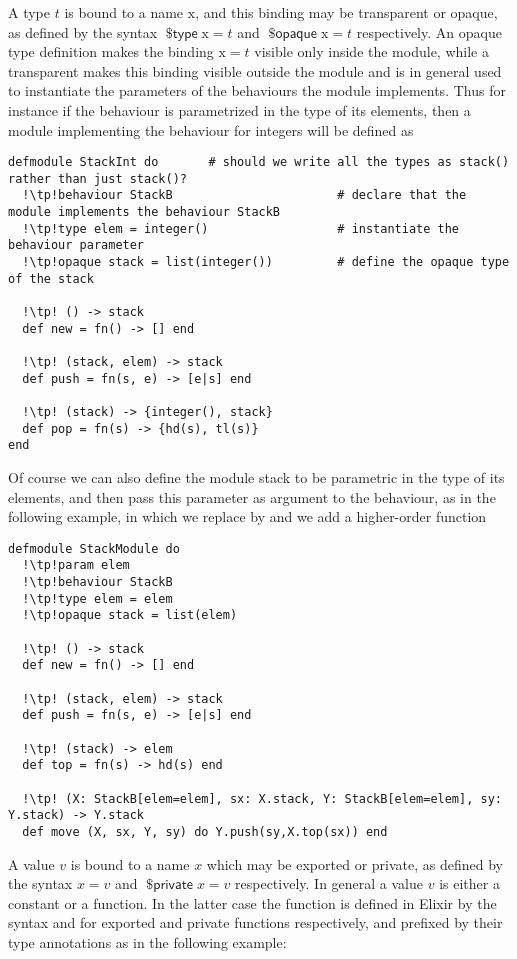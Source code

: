 \documentclass[a4paper,10pt]{article}
\DeclareMathOperator{\kwopq}{\textsf{\$opaque}}
\DeclareMathOperator{\kwtp}{\textsf{\$type}}
\DeclareMathOperator{\kwpr}{\textsf{\$private}}
\newcommand{\tx}{\textrm{x}}
\begin{document}
A type $t$ is bound to a name $\tx$, and this binding may be transparent or opaque, as defined by the syntax $\kwtp \tx = t$ and $\kwopq \tx =t$ respectively. An opaque type definition makes the binding $\tx= t$ visible only inside the module, while a transparent makes this binding visible outside the module and is in general used to instantiate the parameters of the behaviours the module implements. Thus for instance if the  behaviour is parametrized in the type  of its elements, then a module  implementing the behaviour for integers will be defined as
\begin{verbatim}
defmodule StackInt do       # should we write all the types as stack() rather than just stack()?
  !\tp!behaviour StackB                       # declare that the module implements the behaviour StackB 
  !\tp!type elem = integer()                  # instantiate the behaviour parameter
  !\tp!opaque stack = list(integer())         # define the opaque type of the stack

  !\tp! () -> stack
  def new = fn() -> [] end

  !\tp! (stack, elem) -> stack
  def push = fn(s, e) -> [e|s] end

  !\tp! (stack) -> {integer(), stack}
  def pop = fn(s) -> {hd(s), tl(s)}
end
\end{verbatim}
Of course we can also define the module stack to be parametric in the type of
its elements, and then pass this parameter as argument to the behaviour, as in
the following example, in which we replace  by  and we add a
higher-order function
\begin{verbatim}
defmodule StackModule do
  !\tp!param elem
  !\tp!behaviour StackB
  !\tp!type elem = elem
  !\tp!opaque stack = list(elem)

  !\tp! () -> stack
  def new = fn() -> [] end

  !\tp! (stack, elem) -> stack
  def push = fn(s, e) -> [e|s] end

  !\tp! (stack) -> elem
  def top = fn(s) -> hd(s) end

  !\tp! (X: StackB[elem=elem], sx: X.stack, Y: StackB[elem=elem], sy: Y.stack) -> Y.stack
  def move (X, sx, Y, sy) do Y.push(sy,X.top(sx)) end
\end{verbatim}
A value $v$ is bound to a name $x$ which may be exported or private, as defined by the syntax $x = v$ and $\kwpr x = v$ respectively. In general a value $v$ is either a constant or a function. In the latter case the function is defined in Elixir by the syntax  and  for exported and private functions respectively, and prefixed by their type annotations as in the following example:
\end{document}
